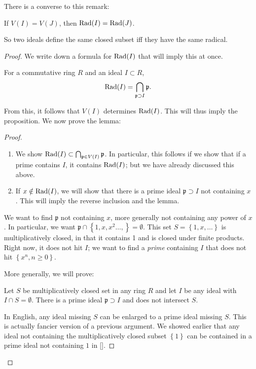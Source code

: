There is a converse to this remark:
\begin{proposition} 
If $V(I) = V(J)$, then $\mathrm{Rad}(I) = \mathrm{Rad}(J)$. 
\end{proposition} 
So two ideals define the same closed subset iff they have the same radical.
\begin{proof} 
We write down a formula for $\mathrm{Rad}(I)$ that will imply this at once.
\begin{lemma} For a commutative ring $R$ and an ideal $I \subset R$, 
\[ \mathrm{Rad}(I) = \bigcap_{\mathfrak{p} \supset I} \mathfrak{p}.  \]
\end{lemma} 
From this, it follows that $V(I)$ determines $\mathrm{Rad}(I)$.  This will thus imply
the proposition.  
We now prove the lemma:
\begin{proof} 
\begin{enumerate}
\item We show $\mathrm{Rad}(I) \subset \bigcap_{\mathfrak{p} \in V(I)} \mathfrak{p} $.  In
particular, this follows if we show that if a prime contains $I$, it contains $\mathrm{Rad}(I)$; but we have already
discussed this above.  
\item If $x \notin \mathrm{Rad}(I)$, we will show that there is a prime ideal $\mathfrak{p}
\supset I$ not containing $x$. This will imply the reverse inclusion and the
lemma.  
\end{enumerate}


We want to find $\mathfrak{p}$ not containing $x$, more generally not
containing any power of $x$.  In particular, we want $\mathfrak{p} \cap \left\{1,
x, x^2 \dots, \right\} = \emptyset$.  This set $S = \left\{1, x, \dots\right\}$
is multiplicatively closed, in that it contains 1 and is closed under
finite products. Right now, it does not hit $I$; we want to find a
\emph{prime} containing $I$ that does not hit $\left\{x^n, n \geq 0\right\}$.


More generally, we will prove:

\begin{sublemma}
Let $S$ be multiplicatively closed set in any ring $R$ and let $I$ be any ideal with $I \cap S  =
\emptyset$.  There is a prime ideal $\mathfrak{p} \supset I$ and does not
intersect $S$.  
\end{sublemma}
In English, any ideal missing $S$ can be enlarged to a prime ideal missing $S$.
This is actually fancier version of a previous argument. We showed earlier that any ideal not
containing the multiplicatively closed subset $\left\{1\right\}$ can be
contained in a prime ideal not containing $1$ in \ref{}.


\end{proof}
\end{proof}
